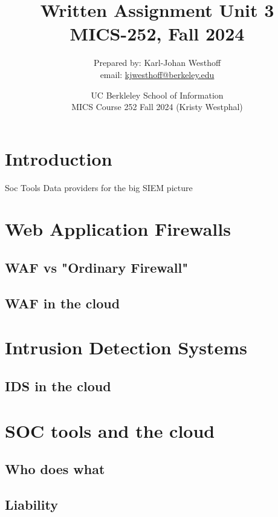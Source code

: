 \documentclass[
	letterpaper, %
	10pt, %
	unnumberedsections, %
	twoside, %
]{APAAssignment}
\title{Written Assignment Unit 3 \\ MICS-252, Fall 2024} %
\date{UC Berkleley School of Information \\
MICS Course 252 Fall 2024 (Kristy Westphal)
}
\author{
	Prepared by: Karl-Johan Westhoff \\
	email: \href{mailto:kjwesthoff@berkeley.edu}{kjwesthoff@berkeley.edu}
}
\begin{document}
\onecolumn
\maketitle %


\section{Introduction}
Soc Tools
Data providers for the big SIEM picture 



\section{Web Application Firewalls}



\subsection{WAF vs "Ordinary Firewall"}



\subsection{WAF in the cloud}


\section{Intrusion Detection Systems}
\subsection{IDS in the cloud}

\section{SOC tools and the cloud}

\subsection{Who does what}

\subsection{Liability}
\end{document}
